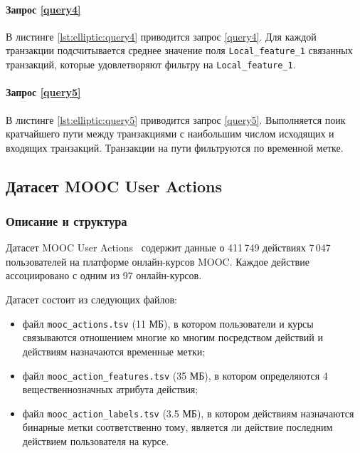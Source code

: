 \paragraph{Запрос \ref{query4}}

В листинге \ref{lst:elliptic:query4} приводится запрос \ref{query4}. Для каждой транзакции подсчитывается среднее
значение поля \texttt{Local\_feature\_1} связанных транзакций, которые удовлетворяют фильтру на \texttt{Local\_feature\_1}.

\paragraph{Запрос \ref{query5}}

В листинге \ref{lst:elliptic:query5} приводится запрос \ref{query5}. Выполняется поик кратчайшего пути между
транзакциями с наибольшим числом исходящих и входящих транзакций. Транзакции на пути фильтруются по временной
метке.

\subsection{Датасет MOOC User Actions}

\subsubsection{Описание и структура}

Датасет MOOC User Actions~\cite{mooc} содержит данные о 411\,749 действиях 7\,047 пользователей на платформе
онлайн-курсов MOOC. Каждое действие ассоциировано с одним из 97 онлайн-курсов.

Датасет состоит из следующих файлов:
\begin{itemize}
    \item файл \texttt{mooc\_actions.tsv} (11 МБ), в котором пользователи и курсы связываются отношением многие ко многим
посредством действий и действиям назначаются временные метки;
    \item файл \texttt{mooc\_action\_features.tsv} (35 МБ), в котором определяются 4 вещественнозначных атрибута
действия;
    \item файл \texttt{mooc\_action\_labels.tsv} (3.5 МБ), в котором действиям назначаются бинарные метки соответственно
тому, является ли действие последним действием пользователя на курсе.
\end{itemize}

